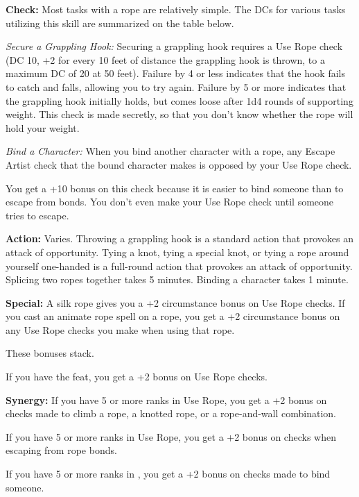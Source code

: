 \textbf{Check:} Most tasks with a rope are relatively simple. The DCs for various tasks utilizing this skill are summarized on the table below.


\textit{Secure a Grappling Hook:} Securing a grappling hook requires a Use Rope check (DC 10, +2 for every 10 feet of distance the grappling hook is thrown, to a maximum DC of 20 at 50 feet). Failure by 4 or less indicates that the hook fails to catch and falls, allowing you to try again. Failure by 5 or more indicates that the grappling hook initially holds, but comes loose after 1d4 rounds of supporting weight. This check is made secretly, so that you don’t know whether the rope will hold your weight.

\textit{Bind a Character:} When you bind another character with a rope, any Escape Artist check that the bound character makes is opposed by your Use Rope check.

You get a +10 bonus on this check because it is easier to bind someone than to escape from bonds. You don’t even make your Use Rope check until someone tries to escape.

\textbf{Action:} Varies. Throwing a grappling hook is a standard action that provokes an attack of opportunity. Tying a knot, tying a special knot, or tying a rope around yourself one-handed is a full-round action that provokes an attack of opportunity. Splicing two ropes together takes 5 minutes. Binding a character takes 1 minute.

\textbf{Special:} A silk rope gives you a +2 circumstance bonus on Use Rope checks. If you cast an animate rope spell on a rope, you get a +2 circumstance bonus on any Use Rope checks you make when using that rope.

These bonuses stack.

If you have the  feat, you get a +2 bonus on Use Rope checks.

\textbf{Synergy:} If you have 5 or more ranks in Use Rope, you get a +2 bonus on  checks made to climb a rope, a knotted rope, or a rope-and-wall combination.

If you have 5 or more ranks in Use Rope, you get a +2 bonus on  checks when escaping from rope bonds.

If you have 5 or more ranks in , you get a +2 bonus on checks made to bind someone.
